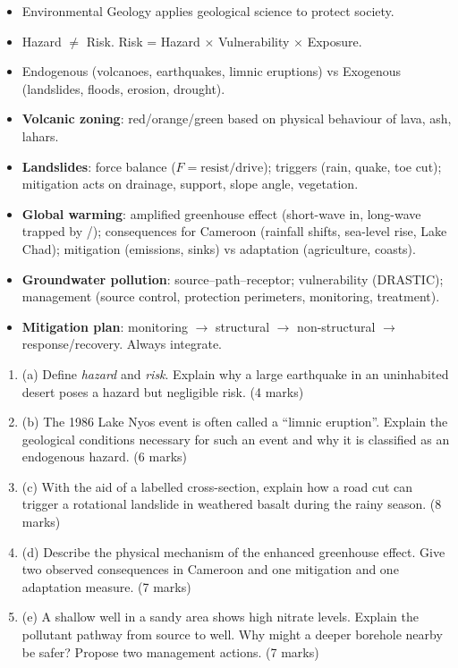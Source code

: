\documentclass[11pt]{article}
\newcommand{\cle}[1]{{\popxbold\color{popdark}#1}}
\begin{document}
\begin{aretenir}
\begin{itemize}
\item Environmental Geology applies geological science to protect society.
\item \cle{Hazard} $\neq$ \cle{Risk}. Risk = Hazard $\times$ Vulnerability $\times$ Exposure.
\item \cle{Endogenous} (volcanoes, earthquakes, limnic eruptions) vs \cle{Exogenous} (landslides, floods, erosion, drought).
\item \textbf{Volcanic zoning}: red/orange/green based on physical behaviour of lava, ash, lahars.
\item \textbf{Landslides}: force balance ($F = \text{resist}/\text{drive}$); triggers (rain, quake, toe cut); mitigation acts on drainage, support, slope angle, vegetation.
\item \textbf{Global warming}: amplified greenhouse effect (short-wave in, long-wave trapped by /); consequences for Cameroon (rainfall shifts, sea-level rise, Lake Chad); mitigation (emissions, sinks) vs adaptation (agriculture, coasts).
\item \textbf{Groundwater pollution}: source–path–receptor; vulnerability (DRASTIC); management (source control, protection perimeters, monitoring, treatment).
\item \textbf{Mitigation plan}: monitoring $\rightarrow$ structural $\rightarrow$ non-structural $\rightarrow$ response/recovery. Always integrate.
\end{itemize}
\end{aretenir}

\begin{exercice}
\begin{enumerate}
\item (a) Define \emph{hazard} and \emph{risk}. Explain why a large earthquake in an uninhabited desert poses a hazard but negligible risk. (4 marks)
\item (b) The 1986 Lake Nyos event is often called a ``limnic eruption''. Explain the geological conditions necessary for such an event and why it is classified as an endogenous hazard. (6 marks)
\item (c) With the aid of a labelled cross-section, explain how a road cut can trigger a rotational landslide in weathered basalt during the rainy season. (8 marks)
\item (d) Describe the physical mechanism of the enhanced greenhouse effect. Give two observed consequences in Cameroon and one mitigation and one adaptation measure. (7 marks)
\item (e) A shallow well in a sandy area shows high nitrate levels. Explain the pollutant pathway from source to well. Why might a deeper borehole nearby be safer? Propose two management actions. (7 marks)
\end{enumerate}
\end{exercice}
\end{document}
